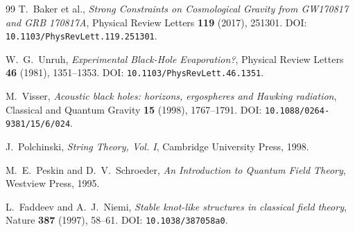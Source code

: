 \documentclass[11pt,a4paper]{article}
\begin{document}
\begin{thebibliography}{99}
T.~Baker et al.,
\textit{Strong Constraints on Cosmological Gravity from GW170817 and GRB 170817A},
Physical Review Letters \textbf{119} (2017), 251301.
DOI: \texttt{10.1103/PhysRevLett.119.251301}.

W.~G.~Unruh,
\textit{Experimental Black-Hole Evaporation?},
Physical Review Letters \textbf{46} (1981), 1351--1353.
DOI: \texttt{10.1103/PhysRevLett.46.1351}.

M.~Visser,
\textit{Acoustic black holes: horizons, ergospheres and Hawking radiation},
Classical and Quantum Gravity \textbf{15} (1998), 1767--1791.
DOI: \texttt{10.1088/0264-9381/15/6/024}.

J.~Polchinski,
\textit{String Theory, Vol. I},
Cambridge University Press, 1998.

M.~E.~Peskin and D.~V.~Schroeder,
\textit{An Introduction to Quantum Field Theory},
Westview Press, 1995.

L.~Faddeev and A.~J.~Niemi,
\textit{Stable knot-like structures in classical field theory},
Nature \textbf{387} (1997), 58--61.
DOI: \texttt{10.1038/387058a0}.

\end{thebibliography}
\end{document}
